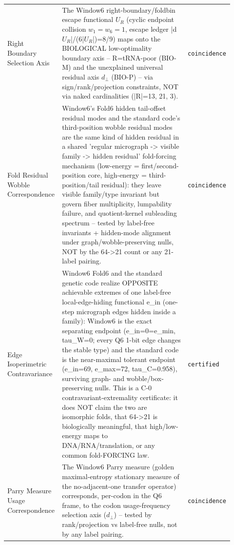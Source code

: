 \begin{longtable}{>{\raggedright\arraybackslash}p{0.22\linewidth}>{\raggedright\arraybackslash}p{0.55\linewidth}>{\raggedright\arraybackslash}p{0.15\linewidth}}
Right Boundary Selection Axis & The Window6 right-boundary/foldbin escape functional $U_R$ (cyclic endpoint collision $w_1=w_6=1$, escape ledger |d$U_R$|/(6|$U_R$|)=8/9) maps onto the BIOLOGICAL low-optimality boundary axis -- R=tRNA-poor (BIO-M) and the unexplained universal residual axis $d_{\perp}$ (BIO-P) -- via sign/rank/projection constraints, NOT via naked cardinalities (|R|=13, 21, 3). & \texttt{coincidence} \\
Fold Residual Wobble Correspondence & Window6's Fold6 hidden tail-offset residual modes and the standard code's third-position wobble residual modes are the same kind of hidden residual in a shared 'regular micrograph -> visible family -> hidden residual' fold-forcing mechanism (low-energy = first/second-position core, high-energy = third-position/tail residual): they leave visible family/type invariant but govern fiber multiplicity, lumpability failure, and quotient-kernel subleading spectrum -- tested by label-free invariants + hidden-mode alignment under graph/wobble-preserving nulls, NOT by the 64->21 count or any 21-label pairing. & \texttt{coincidence} \\
Edge Isoperimetric Contravariance & Window6 Fold6 and the standard genetic code realize OPPOSITE achievable extremes of one label-free local-edge-hiding functional e\_in (one-step micrograph edges hidden inside a family): Window6 is the exact separating endpoint (e\_in=0=e\_min, tau\_W=0; every Q6 1-bit edge changes the stable type) and the standard code is the near-maximal tolerant endpoint (e\_in=69, e\_max=72, tau\_C=0.958), surviving graph- and wobble/box-preserving nulls. This is a C-0 contravariant-extremality certificate: it does NOT claim the two are isomorphic folds, that 64->21 is biologically meaningful, that high/low-energy maps to DNA/RNA/translation, or any common fold-FORCING law. & \texttt{certified} \\
Parry Measure Usage Correspondence & The Window6 Parry measure (golden maximal-entropy stationary measure of the no-adjacent-one transfer operator) corresponds, per-codon in the Q6 frame, to the codon usage-frequency selection axis ($d_{\perp}$) -- tested by rank/projection vs label-free nulls, not by any label pairing. & \texttt{coincidence} \\

\end{longtable}
